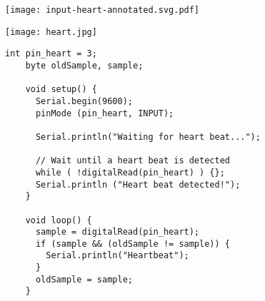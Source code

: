 \vspace{0.1in}
\begin{minipage}[t]{0.49\tw}
  \vspace{0pt}
  \texttt{[image: input-heart-annotated.svg.pdf]}

  \vspace{0pt}
  \texttt{[image: heart.jpg]}
\end{minipage}
\hfill
\begin{minipage}[t]{0.49\tw}
  \vspace{0.1in}
  \begin{Verbatim}[gobble=3,fontsize=\small]
    int pin_heart = 3;
    byte oldSample, sample;

    void setup() {
      Serial.begin(9600);
      pinMode (pin_heart, INPUT);

      Serial.println("Waiting for heart beat...");

      // Wait until a heart beat is detected
      while ( !digitalRead(pin_heart) ) {};
      Serial.println ("Heart beat detected!");
    }

    void loop() {
      sample = digitalRead(pin_heart);
      if (sample && (oldSample != sample)) {
        Serial.println("Heartbeat");
      }
      oldSample = sample;
    }

  \end{Verbatim}
\end{minipage}

